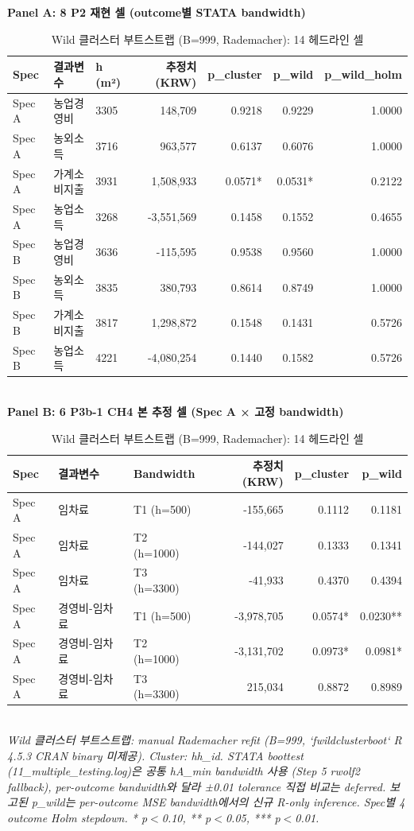 \begin{table}[t]
\centering
\caption{Wild 클러스터 부트스트랩 (B=999, Rademacher): 14 헤드라인 셀}
\label{tab:wild_bootstrap_ko}
\textbf{Panel A: 8 P2 재현 셀 (outcome별 STATA bandwidth)}\\
\begin{tabular}{lllrrrr}
\toprule
Spec & 결과변수 & h (m²) & 추정치 (KRW) & p\_cluster & p\_wild & p\_wild\_holm \\
\midrule
Spec A & 농업경영비 & 3305 & 148,709 & 0.9218 & 0.9229 & 1.0000 \\
Spec A & 농외소득 & 3716 & 963,577 & 0.6137 & 0.6076 & 1.0000 \\
Spec A & 가계소비지출 & 3931 & 1,508,933 & 0.0571* & 0.0531* & 0.2122 \\
Spec A & 농업소득 & 3268 & -3,551,569 & 0.1458 & 0.1552 & 0.4655 \\
Spec B & 농업경영비 & 3636 & -115,595 & 0.9538 & 0.9560 & 1.0000 \\
Spec B & 농외소득 & 3835 & 380,793 & 0.8614 & 0.8749 & 1.0000 \\
Spec B & 가계소비지출 & 3817 & 1,298,872 & 0.1548 & 0.1431 & 0.5726 \\
Spec B & 농업소득 & 4221 & -4,080,254 & 0.1440 & 0.1582 & 0.5726 \\
\bottomrule
\end{tabular}\\[1ex]
\textbf{Panel B: 6 P3b-1 CH4 본 추정 셀 (Spec A × 고정 bandwidth)}\\
\begin{tabular}{lllrrr}
\toprule
Spec & 결과변수 & Bandwidth & 추정치 (KRW) & p\_cluster & p\_wild \\
\midrule
Spec A & 임차료 & T1 (h=500) & -155,665 & 0.1112 & 0.1181 \\
Spec A & 임차료 & T2 (h=1000) & -144,027 & 0.1333 & 0.1341 \\
Spec A & 임차료 & T3 (h=3300) & -41,933 & 0.4370 & 0.4394 \\
Spec A & 경영비-임차료 & T1 (h=500) & -3,978,705 & 0.0574* & 0.0230** \\
Spec A & 경영비-임차료 & T2 (h=1000) & -3,131,702 & 0.0973* & 0.0981* \\
Spec A & 경영비-임차료 & T3 (h=3300) & 215,034 & 0.8872 & 0.8989 \\
\bottomrule
\end{tabular}\\
\footnotesize\textit{Wild 클러스터 부트스트랩: manual Rademacher refit (B=999, `fwildclusterboot` R 4.5.3 CRAN binary 미제공). Cluster: hh\_id. STATA boottest (11\_multiple\_testing.log)은 공통 hA\_min bandwidth 사용 (Step 5 rwolf2 fallback), per-outcome bandwidth와 달라 ±0.01 tolerance 직접 비교는 deferred. 보고된 p\_wild는 per-outcome MSE bandwidth에서의 신규 R-only inference. Spec별 4 outcome Holm stepdown. * p$<$0.10, ** p$<$0.05, *** p$<$0.01.}
\end{table}

